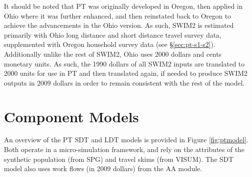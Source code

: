 It should be noted that PT was originally developed in Oregon, then applied in Ohio where it was further enhanced, and then reinstated back to Oregon to achieve the advancements in the Ohio version. As such, SWIM2 is estimated primarily with Ohio long distance and short distance travel survey data, supplemented with Oregon household survey data (see \S\ref{sec:pt-s1-s2}). Additionally unlike the rest of SWIM2, Ohio uses 2000 dollars and cents monetary units. As such, the 1990 dollars of all SWIM2 inputs are translated to 2000 units for use in PT and then translated again, if needed to produce SWIM2 outputs in 2009 dollars in order to remain consistent with the rest of the model. 

\section{Component Models}
An overview of the PT SDT and LDT models is provided in Figure \ref{fig:ptmodel}. Both operate in a micro-simulation framework, and rely on the attributes of the synthetic population (from SPG) and travel skims (from VISUM). The SDT model also uses work flows (in 2009 dollars) from the AA module. 

